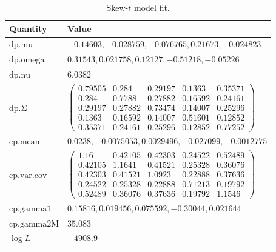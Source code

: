 \begin{table}[ht]
\centering
\begin{tabular}{ll}
\toprule
Quantity & Value \\
\midrule
$\mathrm{dp.mu}$ & $-0.14603, -0.028759, -0.076765, 0.21673, -0.024823$ \\
$\mathrm{dp.omega}$ & $0.31543, 0.021758, 0.12127, -0.51218, -0.05226$ \\
$\mathrm{dp.nu}$ & $6.0382$ \\
$\mathrm{dp.\Sigma}$ & $\begin{pmatrix}0.79505 & 0.284 & 0.29197 & 0.1363 & 0.35371\\0.284 & 0.7788 & 0.27882 & 0.16592 & 0.24161\\0.29197 & 0.27882 & 0.73474 & 0.14007 & 0.25296\\0.1363 & 0.16592 & 0.14007 & 0.51601 & 0.12852\\0.35371 & 0.24161 & 0.25296 & 0.12852 & 0.77252\end{pmatrix}$ \\
$\mathrm{cp.mean}$ & $0.0238, -0.0075053, 0.0029496, -0.027099, -0.0012775$ \\
$\mathrm{cp.var.cov}$ & $\begin{pmatrix}1.16 & 0.42105 & 0.42303 & 0.24522 & 0.52489\\0.42105 & 1.1641 & 0.41521 & 0.25328 & 0.36076\\0.42303 & 0.41521 & 1.0923 & 0.22888 & 0.37636\\0.24522 & 0.25328 & 0.22888 & 0.71213 & 0.19792\\0.52489 & 0.36076 & 0.37636 & 0.19792 & 1.1546\end{pmatrix}$ \\
$\mathrm{cp.gamma1}$ & $0.15816, 0.019456, 0.075592, -0.30044, 0.021644$ \\
$\mathrm{cp.gamma2M}$ & $35.083$ \\
$\log L$ & $-4908.9$ \\
\bottomrule
\end{tabular}
\caption{Skew-$t$ model fit.}
\end{table}